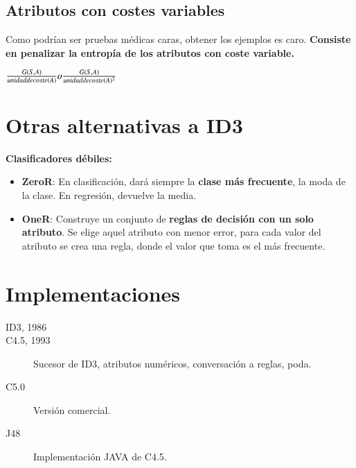 \documentclass[12pt, twoside, openright]{report} %
\begin{document}
\subsection{Atributos con costes variables}

Como podrían ser pruebas médicas caras, obtener los ejemplos es caro. \textbf{Consiste en penalizar la entropía de los atributos con coste variable.}

\(\frac {G(S, A)}{unidad \space de \space coste(A)} o \frac {G(S, A)}{unidad \space de \space coste(A)^2}\)

\section{Otras alternativas a ID3}

\textbf{Clasificadores débiles:}

\begin{itemize}
	\item \textbf{ZeroR}: En clasificación, dará siempre la \textbf{clase más frecuente}, la moda de la clase. En regresión, devuelve la media.
	\item \textbf{OneR}: Construye un conjunto de \textbf{reglas de decisión con un solo atributo}. Se elige aquel atributo con menor error, para cada valor del atributo se crea una regla, donde el valor que toma es el más frecuente.
\end{itemize}

\section{Implementaciones}

\begin{description}
	\item[ID3, 1986]
	\item[C4.5, 1993] Sucesor de ID3, atributos numéricos, conversación a reglas, poda.
	\item[C5.0] Versión comercial.
	\item[J48] Implementación JAVA de C4.5.
\end{description}
\end{document}
